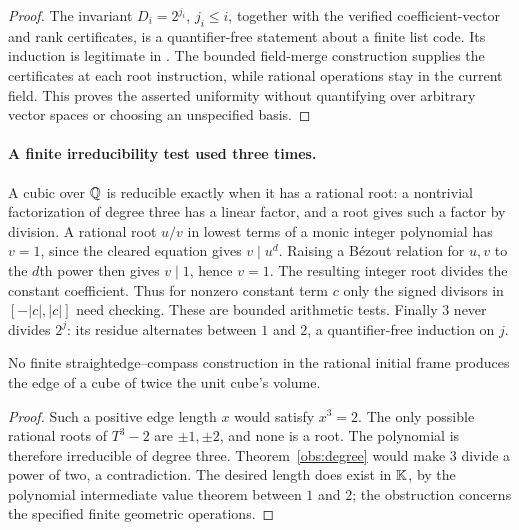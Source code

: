 \begin{proof}
The invariant $D_i=2^{j_i}$, $j_i\le i$, together with the verified
coefficient-vector and rank certificates, is a quantifier-free statement
about a finite list code.  Its induction is legitimate in \ipra.
The bounded field-merge construction supplies the certificates at each
root instruction, while rational operations stay in the current field.
This proves the asserted uniformity without quantifying over arbitrary
vector spaces or choosing an unspecified basis.
\end{proof}

\paragraph{A finite irreducibility test used three times.}
A cubic over $\mathbb Q$ is reducible exactly when it has a rational root: a
nontrivial factorization of degree three has a linear factor, and a root
gives such a factor by division.  A rational root $u/v$ in lowest terms
of a monic integer polynomial has $v=1$, since the cleared equation
gives $v\mid u^d$.  Raising a B\'ezout relation for $u,v$ to the $d$th
power then gives $v\mid1$, hence $v=1$.  The resulting integer
root divides the constant coefficient.  Thus for nonzero constant term
$c$ only the signed divisors in $[-|c|,|c|]$ need checking.  These are
bounded arithmetic tests.  Finally $3$ never divides $2^j$: its residue
alternates between $1$ and $2$, a quantifier-free induction on $j$.

\begin{theorem}
\label{obs:cube}
No finite straightedge--compass construction in the rational initial frame
produces the edge of a cube of twice the unit cube's volume.
\end{theorem}
\begin{proof}
Such a positive edge length $x$ would satisfy $x^3=2$.
The only possible rational roots of $T^3-2$ are $\pm1,\pm2$, and
none is a root.  The polynomial is therefore irreducible of degree three.
Theorem~\ref{obs:degree} would make $3$ divide a power of two, a
contradiction.  The desired length does exist in $\mathbb K$, by the polynomial
intermediate value theorem between $1$ and $2$; the obstruction concerns
the specified finite geometric operations.
\end{proof}

